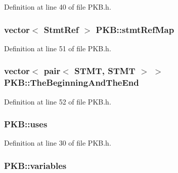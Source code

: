 Definition at line 40 of file P\-K\-B.\-h.

\hypertarget{class_p_k_b_a5d6117050599ff7205c7fc88426b4435}{
\subsubsection[{stmt\-Ref\-Map}]{\setlength{\rightskip}{0pt plus 5cm}vector$<$ {\bf Stmt\-Ref} $>$ P\-K\-B\-::stmt\-Ref\-Map\hspace{0.3cm}{\ttfamily [static]}}}\label{class_p_k_b_a5d6117050599ff7205c7fc88426b4435}


Definition at line 51 of file P\-K\-B.\-h.

\hypertarget{class_p_k_b_a960218307dbb38c796142a0f392205b6}{
\subsubsection[{The\-Beginning\-And\-The\-End}]{\setlength{\rightskip}{0pt plus 5cm}vector$<$ pair$<$ {\bf S\-T\-M\-T}, {\bf S\-T\-M\-T} $>$ $>$ P\-K\-B\-::\-The\-Beginning\-And\-The\-End\hspace{0.3cm}{\ttfamily [static]}}}\label{class_p_k_b_a960218307dbb38c796142a0f392205b6}


Definition at line 52 of file P\-K\-B.\-h.

\hypertarget{class_p_k_b_aec685879d658ff43471889ddbee175a9}{
\subsubsection[{uses}]{ P\-K\-B\-::uses\hspace{0.3cm}{\ttfamily [static]}}}\label{class_p_k_b_aec685879d658ff43471889ddbee175a9}


Definition at line 30 of file P\-K\-B.\-h.

\hypertarget{class_p_k_b_a04a10fef1b34afbe28d6e217e7e11d20}{
\subsubsection[{variables}]{ P\-K\-B\-::variables\hspace{0.3cm}{\ttfamily [static]}}}\label{class_p_k_b_a04a10fef1b34afbe28d6e217e7e11d20}


